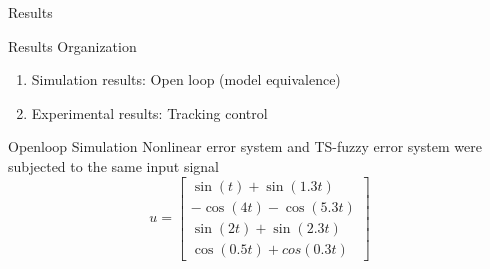 \begin{frame}{Results}
\begin{block}{Results Organization}
	\begin{enumerate}
		\item Simulation results: Open loop (model equivalence)
		\item Experimental results: Tracking control
		
	\end{enumerate}
\end{block}
\end{frame}

\begin{frame}{Openloop Simulation}
Nonlinear error system and TS-fuzzy error system were subjected to the same input signal
\begin{equation}
u = \begin{bmatrix}
\sin(t)+\sin(1.3t)\\
-\cos(4t)-\cos(5.3t)\\
\sin(2t)+\sin(2.3t)\\
\cos(0.5t)+cos(0.3t)
\end{bmatrix}
\end{equation}
\end{frame}

